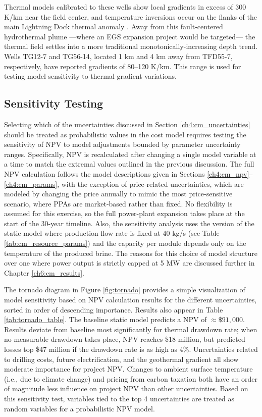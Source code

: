 Thermal models calibrated to these wells show local gradients in excess of 300 K/km near the field center, and temperature inversions occur on the flanks of the main Lightning Dock thermal anomaly \citep[see Figs.\ 23--24,][]{cunniff_final_2005}. Away from this fault-centered hydrothermal plume ---where an EGS expansion project would be targeted--- the thermal field settles into a more traditional monotonically-increasing depth trend. Wells TG12-7 and TG56-14, located 1 km and 4 km away from TFD55-7, respectively, have reported gradients of 80--120 K/km. This range is used for testing model sensitivity to thermal-gradient variations.

\subsection{Sensitivity Testing}\label{ch4:sensitivity}

Selecting which of the uncertainties discussed in Section \ref{ch4:cm_uncertainties} should be treated as probabilistic values in the cost model requires testing the sensitivity of NPV to model adjustments bounded by parameter uncertainty ranges. Specifically, NPV is recalculated after changing a single model variable at a time to match the extremal values outlined in the previous discussion. The full NPV calculation follows the model descriptions given in Sections \ref{ch4:cm_npv}--\ref{ch4:cm_params}, with the exception of price-related uncertainties, which are modeled by changing the price annually to mimic the most price-sensitive scenario, where PPAs are market-based rather than fixed. No flexibility is assumed for this exercise, so the full power-plant expansion takes place at the start of the 30-year timeline. Also, the sensitivity analysis uses the version of the static model where production flow rate is fixed at 40 kg/s (see Table \ref{tab:cm_resource_params}) and the capacity per module depends only on the temperature of the produced brine. The reasons for this choice of model structure over one where power output is strictly capped at 5 MW are discussed further in Chapter \ref{ch6:cm_results}.

The tornado diagram in Figure \ref{fig:tornado} provides a simple visualization of model sensitivity based on NPV calculation results for the different uncertainties, sorted in order of descending importance. Results also appear in Table \ref{tab:tornado_table}. The baseline static model predicts a NPV of $\approx \$91,000$. Results deviate from baseline most significantly for thermal drawdown rate; when no measurable drawdown takes place, NPV reaches \$18 million, but predicted losses top \$47 million if the drawdown rate is as high as 4\%. Uncertainties related to drilling costs, future electrification, and the geothermal gradient all show moderate importance for project NPV. Changes to ambient surface temperature (i.e., due to climate change) and pricing from carbon taxation both have an order of magnitude less influence on project NPV than other uncertainties. Based on this sensitivity test, variables tied to the top 4 uncertainties are treated as random variables for a probabilistic NPV model.

